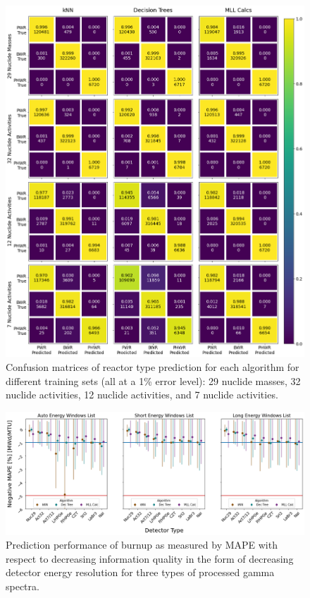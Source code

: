 \begin{figure}[!htb]
  \centering
  \includegraphics[width=\textwidth]{./chapters/exp2/confusion_matrix_nucs_acts.png}
  \caption{Confusion matrices of reactor type prediction for each algorithm 
           for different training sets (all at a 1\% error level): 29 nuclide 
           masses, 32 nuclide activities, 12 nuclide activities, and 7 nuclide 
           activities.}
  \label{fig:cm_nucs_acts}
\end{figure}


\begin{figure}[!htb]
  \centering
  \includegraphics[width=\textwidth]{./chapters/exp2/detector_preds_wrt_enlist_MAPE_burn.png}
  \caption{Prediction performance of burnup as measured by \gls{MAPE} with 
           respect to decreasing information quality in the form of decreasing 
           detector energy resolution for three types of processed gamma spectra.}
  \label{fig:burn}
\end{figure}

